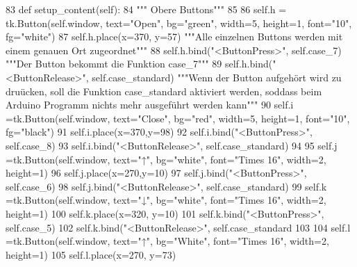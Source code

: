 \begin{DoxyCode}
83     \textcolor{keyword}{def }setup\_content(self):
84 \textcolor{stringliteral}{""" Obere Buttons"""}
85         
86         self.h = tk.Button(self.window, text=\textcolor{stringliteral}{"Open"}, bg=\textcolor{stringliteral}{"green"}, width=5, height=1, font=\textcolor{stringliteral}{"10"}, fg=\textcolor{stringliteral}{"white"})
87         self.h.place(x=370, y=57)                                                                          
          \textcolor{stringliteral}{"""Alle einzelnen Buttons werden mit einem genauen Ort zugeordnet"""}
88         self.h.bind(\textcolor{stringliteral}{"<ButtonPress>"}, self.case\_7)                                                          
          \textcolor{stringliteral}{"""Der Button bekommt die Funktion case\_7"""}
89         self.h.bind(\textcolor{stringliteral}{"<ButtonRelease>"}, self.case\_standard)                                                 
          \textcolor{stringliteral}{"""Wenn der Button aufgehört wird zu druücken, soll die Funktion case\_standard aktiviert werden, soddass
       beim Arduino Programm nichts mehr ausgeführt werden kann"""}
90         self.i =tk.Button(self.window, text=\textcolor{stringliteral}{"Close"}, bg=\textcolor{stringliteral}{"red"}, width=5, height=1, font=\textcolor{stringliteral}{"10"}, fg=\textcolor{stringliteral}{"black"})
91         self.i.place(x=370,y=98) 
92         self.i.bind(\textcolor{stringliteral}{"<ButtonPress>"}, self.case\_8)
93         self.i.bind(\textcolor{stringliteral}{"<ButtonRelease>"}, self.case\_standard)
94 
95         self.j =tk.Button(self.window, text=\textcolor{stringliteral}{"↑"}, bg=\textcolor{stringliteral}{"white"}, font=\textcolor{stringliteral}{"Times 16"}, width=2, height=1)
96         self.j.place(x=270,y=10) 
97         self.j.bind(\textcolor{stringliteral}{"<ButtonPress>"}, self.case\_6)
98         self.j.bind(\textcolor{stringliteral}{"<ButtonRelease>"}, self.case\_standard)
99         self.k =tk.Button(self.window, text=\textcolor{stringliteral}{"↓"}, bg=\textcolor{stringliteral}{"white"}, font=\textcolor{stringliteral}{"Times 16"}, width=2, height=1)
100         self.k.place(x=320, y=10)
101         self.k.bind(\textcolor{stringliteral}{"<ButtonPress>"}, self.case\_5)
102         self.k.bind(\textcolor{stringliteral}{"<ButtonRelease>"}, self.case\_standard
103 
104         self.l =tk.Button(self.window, text=\textcolor{stringliteral}{"↑"}, bg=\textcolor{stringliteral}{"White"}, font=\textcolor{stringliteral}{"Times 16"}, width=2, height=1)
105         self.l.place(x=270, y=73)

\end{DoxyCode}
